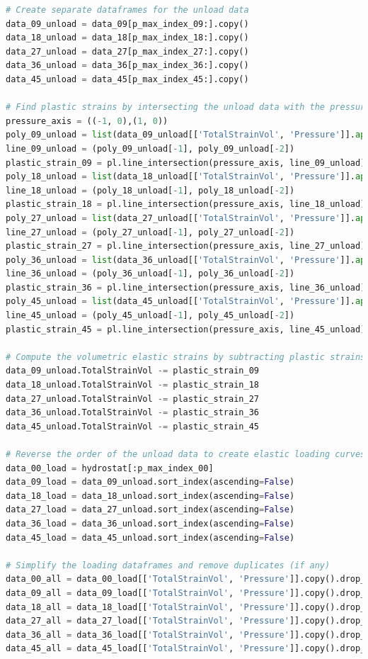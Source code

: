 \begin{lstlisting}[language=Python]
# Create separate dataframes for the unload data
data_09_unload = data_09[p_max_index_09:].copy()
data_18_unload = data_18[p_max_index_18:].copy()
data_27_unload = data_27[p_max_index_27:].copy()
data_36_unload = data_36[p_max_index_36:].copy()
data_45_unload = data_45[p_max_index_45:].copy()

# Find plastic strains by intersecting the unload data with the pressure axis
pressure_axis = ((-1, 0),(1, 0))
poly_09_unload = list(data_09_unload[['TotalStrainVol', 'Pressure']].apply(tuple, axis=1))
line_09_unload = (poly_09_unload[-1], poly_09_unload[-2])
plastic_strain_09 = pl.line_intersection(pressure_axis, line_09_unload)[0]
poly_18_unload = list(data_18_unload[['TotalStrainVol', 'Pressure']].apply(tuple, axis=1))
line_18_unload = (poly_18_unload[-1], poly_18_unload[-2])
plastic_strain_18 = pl.line_intersection(pressure_axis, line_18_unload)[0]
poly_27_unload = list(data_27_unload[['TotalStrainVol', 'Pressure']].apply(tuple, axis=1))
line_27_unload = (poly_27_unload[-1], poly_27_unload[-2])
plastic_strain_27 = pl.line_intersection(pressure_axis, line_27_unload)[0]
poly_36_unload = list(data_36_unload[['TotalStrainVol', 'Pressure']].apply(tuple, axis=1))
line_36_unload = (poly_36_unload[-1], poly_36_unload[-2])
plastic_strain_36 = pl.line_intersection(pressure_axis, line_36_unload)[0]
poly_45_unload = list(data_45_unload[['TotalStrainVol', 'Pressure']].apply(tuple, axis=1))
line_45_unload = (poly_45_unload[-1], poly_45_unload[-2])
plastic_strain_45 = pl.line_intersection(pressure_axis, line_45_unload)[0]

# Compute the volumetric elastic strains by subtracting plastic strains from total strains
data_09_unload.TotalStrainVol -= plastic_strain_09
data_18_unload.TotalStrainVol -= plastic_strain_18
data_27_unload.TotalStrainVol -= plastic_strain_27
data_36_unload.TotalStrainVol -= plastic_strain_36
data_45_unload.TotalStrainVol -= plastic_strain_45

# Reverse the order of the unload data to create elastic loading curves
data_00_load = hydrostat[:p_max_index_00]
data_09_load = data_09_unload.sort_index(ascending=False)
data_18_load = data_18_unload.sort_index(ascending=False)
data_27_load = data_27_unload.sort_index(ascending=False)
data_36_load = data_36_unload.sort_index(ascending=False)
data_45_load = data_45_unload.sort_index(ascending=False)

# Simplify the loading dataframes and remove duplicates (if any)
data_00_all = data_00_load[['TotalStrainVol', 'Pressure']].copy().drop_duplicates()
data_09_all = data_09_load[['TotalStrainVol', 'Pressure']].copy().drop_duplicates()
data_18_all = data_18_load[['TotalStrainVol', 'Pressure']].copy().drop_duplicates()
data_27_all = data_27_load[['TotalStrainVol', 'Pressure']].copy().drop_duplicates()
data_36_all = data_36_load[['TotalStrainVol', 'Pressure']].copy().drop_duplicates()
data_45_all = data_45_load[['TotalStrainVol', 'Pressure']].copy().drop_duplicates()


\end{lstlisting}
